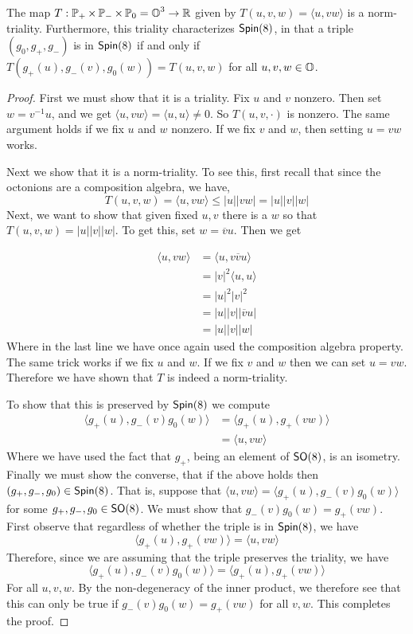 \begin{thm}
The map $T:\operatorname{\mathbb{P}}_+\times \operatorname{\mathbb{P}}_-\times \operatorname{\mathbb{P}}_0 = \operatorname{\mathbb{O}}^3\to \operatorname{\mathbb{R}}$ given by $T(u,v,w)=\langle u,vw\rangle$ is a norm-triality. Furthermore, this triality characterizes $\operatorname{\textsf{Spin}}(8)$, in that a triple $(g_0,g_+,g_-)$ is in $ \operatorname{\textsf{Spin}}(8)$ if and only if $T(g_+(u),g_-(v),g_0(w))=T(u,v,w)$ for all $u,v,w\in \operatorname{\mathbb{O}}$.
\end{thm}
\begin{proof}
First we must show that it is a triality.
Fix $u$ and $v$ nonzero. Then set $w = v^{-1}u$, and we get $\langle u,vw\rangle = \langle u,u\rangle\neq 0$. So $T(u,v,\cdot)$ is nonzero. The same argument holds if we fix $u$ and $w$ nonzero. If we fix $v$ and $w$, then setting $u=vw$ works.

Next we show that it is a norm-triality. To see this, first recall that since the octonions are a composition algebra, we have,
\[T(u,v,w) = \langle u,vw\rangle \leq |u||vw| = |u||v||w|\]
Next, we want to show that given fixed $u,v$ there is a $w$ so that $T(u,v,w) = |u||v||w|$. To get this, set $w = \overline{v}u$. Then we get

\begin{align*}\langle u,vw\rangle &=\langle u,v\overline{v}u\rangle\\
&= |v|^2\langle u,u\rangle\\
&= |u|^2|v|^2\\
&= |u| |v| |\overline{v}u|\\
&= |u||v||w|
\end{align*}
Where in the last line we have once again used the composition algebra property. The same trick works if we fix $u$ and $w$. If we fix $v$ and $w$ then we can set $u=vw$. Therefore we have shown that $T$ is indeed a norm-triality.

To show that this is preserved by $\operatorname{\textsf{Spin}}(8)$ we compute
\begin{align*}
    \langle g_+(u),g_-(v)g_0(w)\rangle
    &= \langle g_+(u),g_+(vw)\rangle\\
    &= \langle u,vw\rangle
\end{align*}
Where we have used the fact that $g_+$, being an element of $\operatorname{\textsf{SO}}(8)$, is an isometry. Finally we must show the converse, that if the above holds then $(g_+,g_-,g_0)\in \operatorname{\textsf{Spin}}(8)$. That is, suppose that $\langle u,vw\rangle = \langle g_+(u),g_-(v)g_0(w)\rangle$ for some $g_+,g_-,g_0\in \operatorname{\textsf{SO}}(8)$. We must show that $g_-(v)g_0(w) = g_+(vw)$. First observe that regardless of whether the triple is in $\operatorname{\textsf{Spin}}(8)$, we have
\[\langle g_+(u),g_+(vw)\rangle=
     \langle u,vw\rangle\]
Therefore, since we are assuming that the triple preserves the triality, we have
\[\langle g_+(u),g_-(v)g_0(w)\rangle =\langle g_+(u),g_+(vw)\rangle \]
For all $u,v,w$. By the non-degeneracy of the inner product, we therefore see that this can only be true if $g_-(v)g_0(w) = g_+(vw)$ for all $v,w$. This completes the proof.
    
\end{proof}